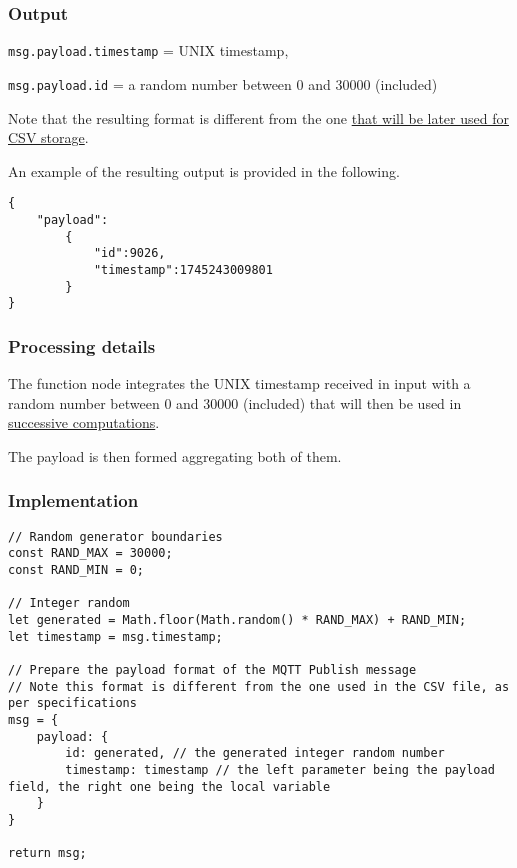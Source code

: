 \documentclass[a4paper,11pt]{article} %
\begin{document}
    \subsubsection{Output}

    \texttt{msg.payload.timestamp} = UNIX timestamp,

    \texttt{msg.payload.id} = a random number between 0 and 30000 (included)

    \medskip

    Note that the resulting format is different from the one \hyperref[subsec:reformat-for-csv-rules:-function-node]{that will be later used for CSV storage}.

    \medskip

    An example of the resulting output is provided in the following.

    \begin{verbatim}
{
    "payload":
        {
            "id":9026,
            "timestamp":1745243009801
        }
}
    \end{verbatim}

    \subsubsection{Processing details}

    The function node integrates the UNIX timestamp received in input with a random number between 0 and 30000 (included) that will then be used in \hyperref[subsec:check-and-prepare:-function-node]{successive computations}.

    \smallskip

    The payload is then formed aggregating both of them.

    \subsubsection{Implementation}

    \begin{verbatim}
// Random generator boundaries
const RAND_MAX = 30000;
const RAND_MIN = 0;

// Integer random
let generated = Math.floor(Math.random() * RAND_MAX) + RAND_MIN;
let timestamp = msg.timestamp;

// Prepare the payload format of the MQTT Publish message
// Note this format is different from the one used in the CSV file, as per specifications
msg = {
    payload: {
        id: generated, // the generated integer random number
        timestamp: timestamp // the left parameter being the payload field, the right one being the local variable
    }
}

return msg;
    \end{verbatim}
\end{document}
